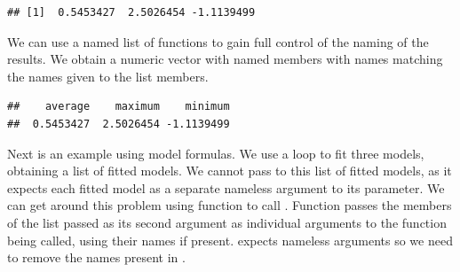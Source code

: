 \documentclass[krantz2]{krantz}\usepackage{knitr}%
\begin{document}
\begin{knitrout}\footnotesize
{}\color{fgcolor}\begin{kframe}
\begin{alltt}
 \hlkwb{<-} \hlstd{()}
 \hlkwb{<-} 
   
    \hlkwb{<-}  
   \hlstd{\}}
\end{alltt}
\begin{verbatim}
## [1]  0.5453427  2.5026454 -1.1139499
\end{verbatim}
\end{kframe}
\end{knitrout}

We can use a named list of functions to gain full control of the naming of the results. We obtain a numeric vector with named members with names matching the names given to the list members.

\begin{knitrout}\footnotesize
{}\color{fgcolor}\begin{kframe}
\begin{alltt}
 \hlkwb{<-} \hlstd{()}
 \hlkwb{<-} \hlstd{(}     
   
    \hlkwb{<-} 
   \hlstd{\}}
\end{alltt}
\begin{verbatim}
##    average    maximum    minimum 
##  0.5453427  2.5026454 -1.1139499
\end{verbatim}
\end{kframe}
\end{knitrout}

Next is an example using model formulas. We use a loop to fit three models, obtaining a list of fitted models. We cannot pass to  this list of fitted models, as it expects each fitted model as a separate nameless argument to its \code{\ldots} parameter. We can get around this problem using function  to call . Function  passes the members of the list passed as its second argument as individual arguments to the function being called, using their names if present.  expects nameless arguments so we need to remove the names present in .
\end{document}
